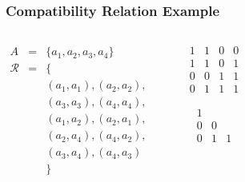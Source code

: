 \documentclass[dvipsnames]{beamer}
\begin{document}
\begin{frame}
  \frametitle{Compatibility Relation Example}

  \begin{example}
    \begin{columns}
      \begin{eqnarray*}
        A           & = & \{a_1,a_2,a_3,a_4\}\\
        \mathcal{R} & = & \{\\
                    &   & (a_1,a_1),(a_2,a_2),\\
                    &   & (a_3,a_3),(a_4,a_4),\\
                    &   & (a_1,a_2),(a_2,a_1),\\
                    &   & (a_2,a_4),(a_4,a_2),\\
                    &   & (a_3,a_4),(a_4,a_3)\\
                    &   & \}
      \end{eqnarray*}

      \begin{center}

        \bigskip
      \end{center}

      \pause
      \begin{center}
        \[
          \begin{array}{|cccc|}
            1  &  1  &  0  &  0\\
            1  &  1  &  0  &  1\\
            0  &  0  &  1  &  1\\
            0  &  1  &  1  &  1
          \end{array}
        \]

        \[
          \begin{array}{|ccc|}
            1  &     & \\
            0  &  0  & \\
            0  &  1  &  1
          \end{array}
        \]
      \end{center}
    \end{columns}
  \end{example}
\end{frame}
\end{document}
